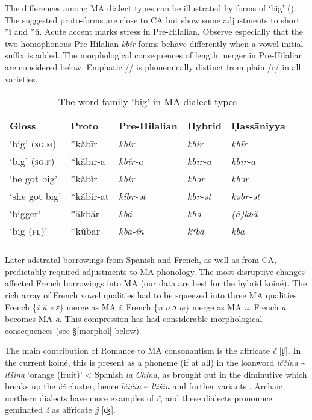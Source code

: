 \documentclass[output=paper]{langsci/langscibook}
\begin{document}
The differences among MA dialect types can be illustrated by forms of ‘big’ (). The suggested proto-forms are close to CA but show some adjustments to short *ĭ and *ŭ. Acute accent marks stress in Pre-Hilalian. Observe especially that the two homophonous Pre-Hilalian \textit{kbír} forms behave differently when a vowel-initial suffix is added. The morphological consequences of length merger in Pre-Hilalian are considered below. Emphatic /{\R}/ is phonemically distinct from plain /r/ in all varieties. 

\begin{table}
\caption{\label{tab:heath:1}\label{bkm:Ref13483830}The word-family `big' in MA dialect types}
\begin{tabular}{*{5}{l}}
\lsptoprule
{Gloss} & {\normalfont Proto} & {\normalfont Pre-Hilalian} & {\normalfont Hybrid} & {\normalfont Ḥassāniyya}\\\midrule
‘big’ (\textsc{sg.m}) & *kăbīr & \textit{kbír} & \textit{kbir} & \textit{kbīr}\\
‘big’ (\textsc{sg.f}) & *kăbīr-a & \textit{kbír-a} & \textit{kbir-a} & \textit{kbīr-a}\\
‘he got big’ & *kăbĭr & \textit{kbír} & \textit{kbər} & \textit{kbər}\\
‘she got big’ & *kăbĭr-at & \textit{kíbr-ət} & \textit{kbr-ət} & \textit{kəbr-ət}\\
‘bigger’ & *ăkbăr & \textit{kbá{\R}} & \textit{kbə{\R}} & \textit{(ă)kbă{\R}}\\
‘big (\textsc{pl})’ & *kŭbār & \textit{kba{\R}-ín} & \textit{kʷba{\R}} & \textit{kbā{\R}}\\
\lspbottomrule
\end{tabular}
\end{table}

Later adstratal borrowings from Spanish and French, as well as from CA, predictably required adjustments to MA phonology. The most disruptive changes affected French borrowings into MA (our data are best for the hybrid koiné). The rich array of French vowel qualities had to be squeezed into three MA qualities. French \{\textit{i} \textit{ü} \textit{e} \textit{ɛ}\} merge as MA \textit{i}. French \{\textit{u} \textit{o} \textit{ɔ} \textit{œ}\} merge as MA \textit{u}. French \textit{a} becomes MA \textit{a}. This compression has had considerable morphological consequences (see §\ref{morphol} below).

The main contribution of Romance to MA consonantism is the affricate \textit{č} [ʧ]. In the current koiné, this is present as a phoneme (if at all) in the loanword \textit{lččina} {\textasciitilde} \textit{ltšina} ‘orange (fruit)’ < Spanish \textit{la} \textit{China}, as brought out in the diminutive which breaks up the \textit{čč} cluster, hence \textit{lčičin} {\textasciitilde} \textit{ltišin} and further variants \citep{Heath1999}. Archaic northern dialects have more examples of \textit{č}, and these dialects pronounce geminated \textit{ž} as affricate \textit{ǧ} [ʤ].
\end{document}
